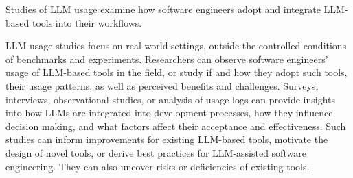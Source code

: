 \label{sec:studying-llm-usage-in-software-engineering}

Studies of LLM usage examine how software engineers adopt and integrate LLM-based tools into their workflows.


LLM usage studies focus on real-world settings, outside the controlled conditions of benchmarks and experiments.
Researchers can observe software engineers' usage of LLM-based tools in the field, or study if and how they adopt such tools, their usage patterns, as well as perceived benefits and challenges.
Surveys, interviews, observational studies, or analysis of usage logs can provide insights into how LLMs are integrated into development processes, how they influence decision making, and what factors affect their acceptance and effectiveness. 
Such studies can inform improvements for existing LLM-based tools, motivate the design of novel tools, or derive best practices for LLM-assisted software engineering.
They can also uncover risks or deficiencies of existing tools.



